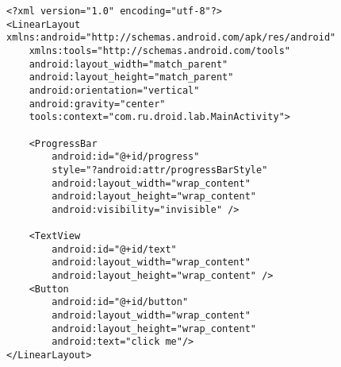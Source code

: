 \begin{lstlisting}[style=A_XML]
<?xml version="1.0" encoding="utf-8"?>
<LinearLayout xmlns:android="http://schemas.android.com/apk/res/android"
    xmlns:tools="http://schemas.android.com/tools"
    android:layout_width="match_parent"
    android:layout_height="match_parent"
    android:orientation="vertical"
    android:gravity="center"
    tools:context="com.ru.droid.lab.MainActivity">

    <ProgressBar
        android:id="@+id/progress"
        style="?android:attr/progressBarStyle"
        android:layout_width="wrap_content"
        android:layout_height="wrap_content"
        android:visibility="invisible" />

    <TextView
        android:id="@+id/text"
        android:layout_width="wrap_content"
        android:layout_height="wrap_content" />
    <Button
        android:id="@+id/button"
        android:layout_width="wrap_content"
        android:layout_height="wrap_content"
        android:text="click me"/>
</LinearLayout>
\end{lstlisting}

